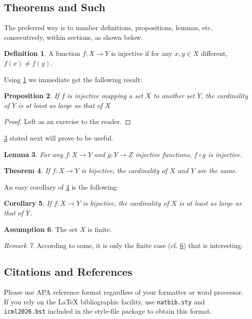 \documentclass{article}
\theoremstyle{plain}
\newtheorem{theorem}{Theorem}[section]
\newtheorem{proposition}[theorem]{Proposition}
\newtheorem{lemma}[theorem]{Lemma}
\newtheorem{corollary}[theorem]{Corollary}
\theoremstyle{definition}
\newtheorem{definition}[theorem]{Definition}
\newtheorem{assumption}[theorem]{Assumption}
\theoremstyle{remark}
\newtheorem{remark}[theorem]{Remark}
\begin{document}
\subsection{Theorems and Such}
The preferred way is to number definitions, propositions, lemmas, etc.
consecutively, within sections, as shown below.
\begin{definition}
  \label{def:inj}
  A function $f:X \to Y$ is injective if for any $x,y\in X$ different, $f(x)\ne
    f(y)$.
\end{definition}
Using \cref{def:inj} we immediate get the following result:
\begin{proposition}
  If $f$ is injective mapping a set $X$ to another set $Y$,
  the cardinality of $Y$ is at least as large as that of $X$
\end{proposition}
\begin{proof}
  Left as an exercise to the reader.
\end{proof}
\cref{lem:usefullemma} stated next will prove to be useful.
\begin{lemma}
  \label{lem:usefullemma}
  For any $f:X \to Y$ and $g:Y\to Z$ injective functions, $f \circ g$ is
  injective.
\end{lemma}
\begin{theorem}
  \label{thm:bigtheorem}
  If $f:X\to Y$ is bijective, the cardinality of $X$ and $Y$ are the same.
\end{theorem}
An easy corollary of \cref{thm:bigtheorem} is the following:
\begin{corollary}
  If $f:X\to Y$ is bijective,
  the cardinality of $X$ is at least as large as that of $Y$.
\end{corollary}
\begin{assumption}
  The set $X$ is finite.
  \label{ass:xfinite}
\end{assumption}
\begin{remark}
  According to some, it is only the finite case (cf. \cref{ass:xfinite}) that
  is interesting.
\end{remark}

\subsection{Citations and References}

Please use APA reference format regardless of your formatter or word processor.
If you rely on the \LaTeX\/ bibliographic facility, use \texttt{natbib.sty} and
\texttt{icml2026.bst} included in the style-file package to obtain this format.
\end{document}
